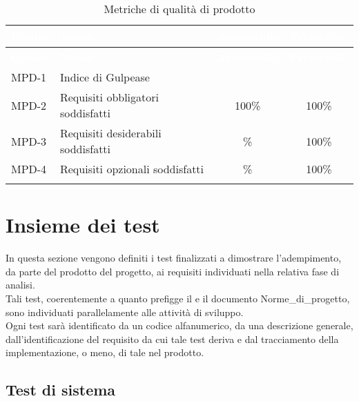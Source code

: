 {
\setlength{\tabcolsep}{10pt}
\renewcommand{\arraystretch}{1.5}
\begin{xltabular}{\textwidth}{| l | X | c | c |}
    \hline
     \textbf{\textcolor{white}{Codice}} & \textbf{\textcolor{white}{Nome}} & \textbf{\textcolor{white}{Accettabile}} & \textbf{\textcolor{white}{Preferibile}} \\
    \hline
    \endfirsthead
    \hline
     \textbf{\textcolor{white}{Codice}} & \textbf{\textcolor{white}{Nome}} & \textbf{\textcolor{white}{Accettabile}} & \textbf{\textcolor{white}{Preferibile}} \\ 
    \endhead
    MPD-1 & Indice di Gulpease &  &  \\
    \hline
    MPD-2 & Requisiti obbligatori soddisfatti & 100\% & 100\% \\
    \hline
    MPD-3 & Requisiti desiderabili soddisfatti & \% & 100\% \\
    \hline
    MPD-4 & Requisiti opzionali soddisfatti & \% & 100\% \\
    \hline
     \caption{Metriche di qualità di prodotto}
    \label{tab:mpd}
\end{xltabular}
}

\section{Insieme dei test} \label{sec:test}
In questa sezione vengono definiti i test finalizzati a dimostrare l'adempimento, da parte del prodotto del progetto, ai requisiti individuati nella relativa fase di analisi.\\
Tali test, coerentemente a quanto prefigge il  e il documento Norme\_di\_progetto, sono individuati parallelamente alle attività di sviluppo.\\
Ogni test sarà identificato da un codice alfanumerico, da una descrizione generale, dall'identificazione del requisito da cui tale test deriva e dal tracciamento della implementazione, o meno, di tale nel prodotto.

\subsection{Test di sistema}

